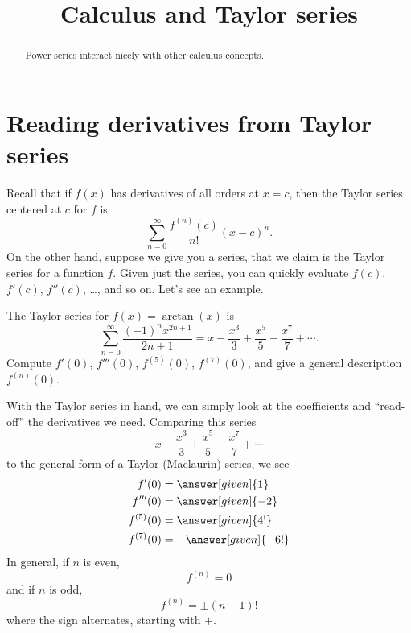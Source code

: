 \documentclass{ximera}
\title[Dig-In:]{Calculus and Taylor series}
\begin{document}
\begin{abstract}
  Power series interact nicely with other calculus concepts.
\end{abstract}
\maketitle

\section{Reading derivatives from Taylor series}

Recall that if $f(x)$ has derivatives of all orders at $x=c$, then the
Taylor series centered at $c$ for $f$ is
\[
\sum_{n=0}^\infty \frac{f^{(n)}(c)}{n!}(x-c)^n.
\]
On the other hand, suppose we give you a series, that we claim is the
Taylor series for a function $f$. Given just the series, you can
quickly evaluate $f(c)$, $f'(c)$, $f''(c)$, \dots, and so on. Let's
see an example.

\begin{example}
  The Taylor series for $f(x) = \arctan(x)$ is
  \[
  \sum_{n=0}^\infty \frac{(-1)^n x^{2n+1}}{2n+1} = x - \frac{x^3}{3} + \frac{x^5}{5} - \frac{x^7}{7} +\cdots.
  \]
  Compute $f'(0)$, $f'''(0)$, $f^{(5)}(0)$, $f^{(7)}(0)$, and give a
  general description $f^{(n)}(0)$.
  \begin{explanation}
    With the Taylor series in hand, we can simply look at the
    coefficients and ``read-off'' the derivatives we need. Comparing this series
    \[
    x - \frac{x^3}{3} + \frac{x^5}{5} - \frac{x^7}{7} +\cdots
    \]
    to the general form of a Taylor (Maclaurin) series, we see
    \begin{align*}
    f'(0) &= \answer[given]{1}\\
    f'''(0) &= \answer[given]{-2}\\
    f^{(5)}(0) &= \answer[given]{4!}\\
    f^{(7)}(0) &= -\answer[given]{-6!}
    \end{align*}
    In general, if $n$ is even,
    \[
    f^{(n)} = 0
    \]
    and if $n$ is odd,
    \[
    f^{(n)} = \pm(n-1)! 
    \]
    where the sign alternates, starting with $+$.
  \end{explanation}
\end{example}
\end{document}
